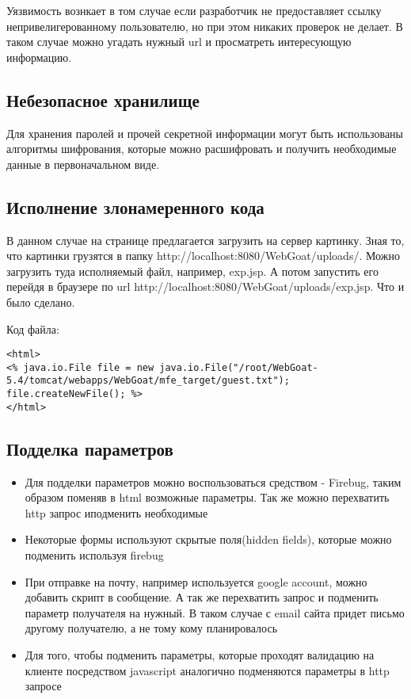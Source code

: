 \documentclass{article}
\begin{document}
Уязвимость вознкает в том случае если разработчик не предоставляет ссылку непривелигерованному пользователю, но при этом никаких проверок не делает. В таком случае можно угадать нужный url и просматреть интересующую информацию.


\subsection{Небезопасное хранилище}

Для хранения паролей и прочей секретной информации могут быть использованы алгоритмы шифрования, которые можно расшифровать и получить необходимые данные в первоначальном виде.

\subsection{Исполнение злонамеренного кода}

В данном случае на странице предлагается загрузить на сервер картинку. Зная то, что картинки грузятся в папку  http://localhost:8080/WebGoat/uploads/. Можно загрузить туда исполняемый файл, например, exp.jsp. А потом запустить его перейдя в браузере по url http://localhost:8080/WebGoat/uploads/exp.jsp. Что и было сделано.

Код файла: 

\begin{verbatim}
<html>
<% java.io.File file = new java.io.File("/root/WebGoat-5.4/tomcat/webapps/WebGoat/mfe_target/guest.txt");
file.createNewFile(); %>
</html>
\end{verbatim}


\subsection{Подделка параметров}

\begin{itemize}
	
	\item Для подделки параметров можно воспользоваться средством - Firebug, таким образом поменяв в html возможные параметры. Так же можно перехватить http запрос иподменить необходимые
	
	\item Некоторые формы используют скрытые поля(hidden fields), которые можно подменить используя firebug
	
	\item При отправке на почту, например используется google account, можно добавить скрипт в сообщение. А так же перехватить запрос и подменить параметр получателя на нужный. В таком случае с email сайта придет письмо другому получателю, а не тому кому планировалось
	
	\item Для того, чтобы подменить параметры, которые проходят валидацию на клиенте посредством javascript аналогично подменяются параметры в http запросе
	
\end{itemize}
\end{document}
